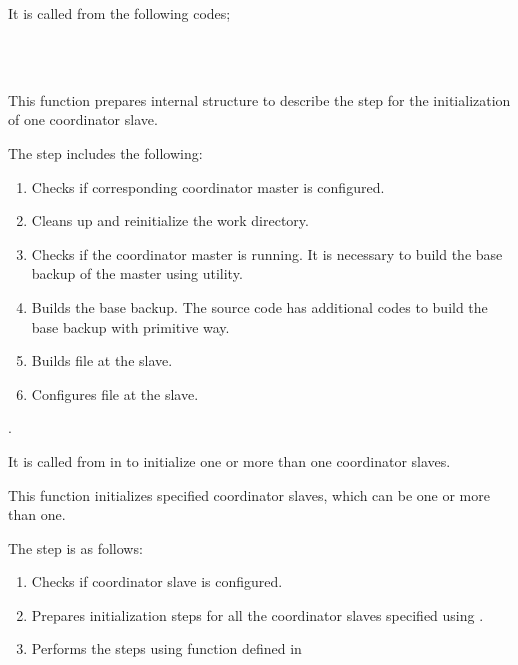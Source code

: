       It is called from the following codes;
      
      \FuncRefHdr
		  \\ \vspace{3pt}
		  \\ \hline
      \FuncRefTrailor
  
  
      This function prepares internal  structure to describe the step for the initialization
      of one coordinator slave.
      
      The step includes the following:
      
      \begin{enumerate}
		  \item Checks if corresponding coordinator master is configured.
		  \item Cleans up and reinitialize the work directory.
		  \item Checks if the coordinator master is running.
		  		It is necessary to build the base backup of the master using  utility.
		  \item Builds the base backup.
		  		The source code has additional codes to build the base backup with primitive way.
		  \item Builds  file at the slave.
		  \item Configures  file at the slave.
      \end{enumerate}.
      
      It is called from  in 
      to initialize one or more than one coordinator slaves.
  
  
      This function initializes specified coordinator slaves, which can be one or more than one.
      
      The step is as follows:
      
      \begin{enumerate}
		  \item Checks if coordinator slave is configured.
		  \item Prepares initialization steps for all the coordinator slaves specified
		  		using .
		  \item Performs the steps using  function defined in 
      \end{enumerate}
  
